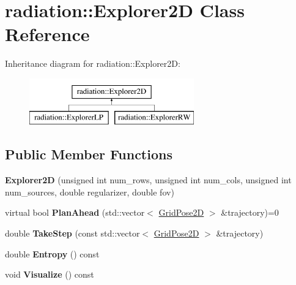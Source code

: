 \hypertarget{classradiation_1_1_explorer2_d}{}\section{radiation\+:\+:Explorer2D Class Reference}
\label{classradiation_1_1_explorer2_d}
Inheritance diagram for radiation\+:\+:Explorer2D\+:\begin{figure}[H]
\begin{center}
\leavevmode
\includegraphics[height=2.000000cm]{classradiation_1_1_explorer2_d}
\end{center}
\end{figure}
\subsection*{Public Member Functions}
\begin{DoxyCompactItemize}
\item 
\hypertarget{classradiation_1_1_explorer2_d_ad16e982f1455a8813c02e4efbbfbdc29}{}\label{classradiation_1_1_explorer2_d_ad16e982f1455a8813c02e4efbbfbdc29} 
{\bfseries Explorer2D} (unsigned int num\+\_\+rows, unsigned int num\+\_\+cols, unsigned int num\+\_\+sources, double regularizer, double fov)
\item 
\hypertarget{classradiation_1_1_explorer2_d_a383dd22050fca3ee0bd47f746f571189}{}\label{classradiation_1_1_explorer2_d_a383dd22050fca3ee0bd47f746f571189} 
virtual bool {\bfseries Plan\+Ahead} (std\+::vector$<$ \hyperlink{classradiation_1_1_grid_pose2_d}{Grid\+Pose2D} $>$ \&trajectory)=0
\item 
\hypertarget{classradiation_1_1_explorer2_d_a406e0a334d57aa05cf1a37bcd4b1fcec}{}\label{classradiation_1_1_explorer2_d_a406e0a334d57aa05cf1a37bcd4b1fcec} 
double {\bfseries Take\+Step} (const std\+::vector$<$ \hyperlink{classradiation_1_1_grid_pose2_d}{Grid\+Pose2D} $>$ \&trajectory)
\item 
\hypertarget{classradiation_1_1_explorer2_d_ac78860771fe00720a8024ef06a1b13b3}{}\label{classradiation_1_1_explorer2_d_ac78860771fe00720a8024ef06a1b13b3} 
double {\bfseries Entropy} () const
\item 
\hypertarget{classradiation_1_1_explorer2_d_a8eaf1135c2d720ac185b4afbb852feee}{}\label{classradiation_1_1_explorer2_d_a8eaf1135c2d720ac185b4afbb852feee} 
void {\bfseries Visualize} () const
\end{DoxyCompactItemize}
